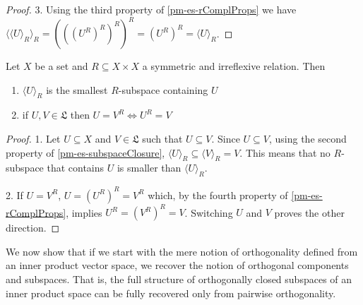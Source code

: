 \begin{mathSection}
\begin{proof}
		3. Using the third property of \ref{pm-es-rComplProps} we have $\langle \langle U \rangle_R \rangle_R = (((U^{R})^{R})^{R})^{R} = (U^{R})^{R} = \langle U \rangle_R$.
	\end{proof}
	
	\begin{prop}
		Let $X$ be a set and $R \subseteq X \times X$ a symmetric and irreflexive relation. Then
		\begin{enumerate}
			\item $\langle U \rangle_R$ is the smallest $R$-subspace containing $U$
			\item if $U, V \in \mathfrak{L}$ then $U = V^{R} \iff U^{R} = V$
		\end{enumerate}
	\end{prop}
	
	\begin{proof}
		1. Let $U \subseteq X$ and $V \in \mathfrak{L}$ such that $U \subseteq V$. Since $U \subseteq V$, using the second property of \ref{pm-es-subspaceClosure}, $\langle U \rangle_R \subseteq \langle V \rangle_R = V$. This means that no $R$-subspace that contains $U$ is smaller than $\langle U \rangle_R$.
		
		2. If $U= V^{R}$, $U = (U^{R})^{R} = V^{R}$ which, by the fourth property of \ref{pm-es-rComplProps}, implies $U^{R} = (V^{R})^{R} = V$. Switching $U$ and $V$ proves the other direction.
	\end{proof}
\end{mathSection}

We now show that if we start with the mere notion of orthogonality defined from an inner product vector space, we recover the notion of orthogonal components and subspaces. That is, the full structure of orthogonally closed subspaces of an inner product space can be fully recovered only from pairwise orthogonality.

